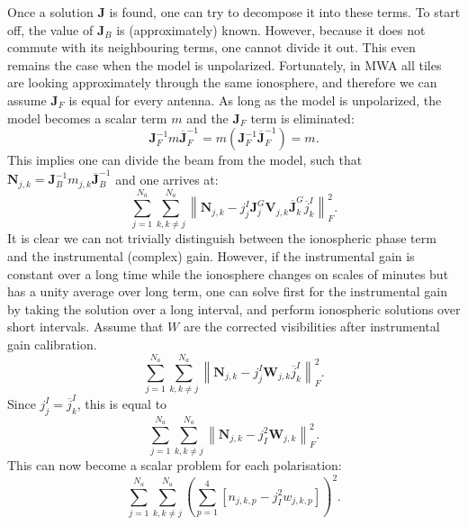 \documentclass[a4paper,11pt]{article}
\begin{document}
Once a solution $\mathbf{J}$ is found, one can try to decompose it into these terms. To start off, the value of $\mathbf{J}_B$ is (approximately) known. However, because it does not commute with its neighbouring terms, one cannot divide it out. This even remains the case when the model is unpolarized. Fortunately, in MWA all tiles are looking approximately through the same ionosphere, and therefore we can assume $\mathbf{J}_F$ is equal for every antenna. As long as the model is unpolarized, the model becomes a scalar term $m$ and the $\mathbf{J}_F$ term is eliminated:
\begin{equation}
 \mathbf{J}_F^{-1} m \overline{\mathbf{J}}_F^{-1} = m \left( \mathbf{J}_F^{-1} \overline{\mathbf{J}}_F^{-1} \right) = m.
\end{equation}
This implies one can divide the beam from the model, such that $\mathbf{N}_{j,k} = \mathbf{J}_B^{-1}m_{j,k}\overline{\mathbf{J}}_B^{-1}$ and one arrives at:
\begin{equation}
 \sum\limits_{j=1}^{N_a} \sum\limits_{k,k\neq j}^{N_a} \left\| \mathbf{N}_{j,k} - j_j^I \mathbf{J}^G_j \mathbf{V}_{j,k} \overline{\mathbf{J}}_k^G \overline{j}_k^I \right\|^2_F.
\end{equation}
It is clear we can not trivially distinguish between the ionospheric phase term and the instrumental (complex) gain. However, if the instrumental gain is constant over a long time while the ionosphere changes on scales of minutes but has a unity average over long term, one can solve first for the instrumental gain by taking the solution over a long interval, and perform ionospheric solutions over short intervals. Assume that $W$ are the corrected visibilities after instrumental gain calibration.
\begin{equation}
 \sum\limits_{j=1}^{N_a} \sum\limits_{k,k\neq j}^{N_a} \left\| \mathbf{N}_{j,k} - j_j^I \mathbf{W}_{j,k} \overline{j}_k^I \right\|^2_F.
\end{equation}
Since $j_j^I = \overline{j}^I_k$, this is equal to
\begin{equation}
 \sum\limits_{j=1}^{N_a} \sum\limits_{k,k\neq j}^{N_a} \left\| \mathbf{N}_{j,k} - j_I^2 \mathbf{W}_{j,k} \right\|^2_F.
\end{equation}
This can now become a scalar problem for each polarisation:
\begin{equation}
 \sum\limits_{j=1}^{N_a} \sum\limits_{k,k\neq j}^{N_a} \left( \sum\limits_{p=1}^4 \left[ n_{j,k,p} - j_I^2 w_{j,k,p} \right] \right)^2.
\end{equation}

\label{lastpage}
\end{document}

